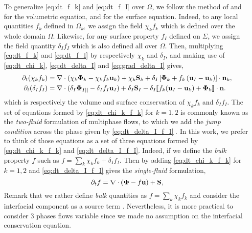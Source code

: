 To generalize \ref{eq:dt_f_k} and \ref{eq:dt_f_I} over $\Omega$, we follow the method of \citet{drew1983mathematical} and \citet{kataoka1986local} for the volumetric equation, and \citet{marle1982macroscopic} for the surface equation.
Indeed, to any local quantities $f_k$ defined in $\Omega_k$, we assign the field $\chi_k f_k$ which is defined over the whole domain $\Omega$. 
Likewise, for any surface property $f_I$ defined on $\Sigma$, we assign the field quantity $\delta_I f_I$ which is also defined all over $\Omega$. 
Then, multiplying \ref{eq:dt_f_k} and \ref{eq:dt_f_I} by respectively $\chi_k$ and $\delta_I$, and making use of \ref{eq:dt_chi_k}, \ref{eq:dt_delta_I} and \ref{eq:grad_delta_I} gives, 
\begin{align}
    \partial_t (\chi_k f_k)
    &= \mathbf{\nabla} \cdot (\chi_k \mathbf{\Phi}_k - \chi_k f_k \textbf{u}_k)
    + \chi_k \textbf{S}_k
    + \delta_I\left[
        \mathbf{\Phi}_k
        + f_k
        \left(
            \textbf{u}_I
            - \textbf{u}_k
        \right)
    \right]
    \cdot \textbf{n}_k ,
    \label{eq:dt_chi_k_f_k}\\
    \partial_t (\delta_If_I)  
    &= 
    \mathbf{\nabla} \cdot (\delta_I \mathbf{\Phi}_{I||} - \delta_I f_I \textbf{u}_I)
    +\delta_I\textbf{S}_I 
    - \delta_I \llbracket 
    f_k (\textbf{u}_I - \textbf{u}_k)
    + \mathbf{\Phi}_k
     \rrbracket \cdot \textbf{n}.
    \label{eq:dt_delta_I_f_I}
\end{align}
which is respectively the volume and surface conservation of $\chi_kf_k$ and $\delta_If_I$. 
The set of equations formed by \ref{eq:dt_chi_k_f_k} for $k =1,2$ is commonly known as the \textit{two-fluid} formulation of multiphase flows, to which we add the \textit{jump condition} across the phase given by \ref{eq:dt_delta_I_f_I} \citep{morel2015mathematical,tryggvason2011direct,drew1983mathematical,kataoka1986local}. 
In this work, we prefer to think of those equations as a set of three equations formed by \ref{eq:dt_chi_k_f_k} and \ref{eq:dt_delta_I_f_I}. 
Indeed, if we define the \textit{bulk} property $f$ such as $f = \sum_k \chi_k f_k + \delta_I f_I$.
Then by adding \ref{eq:dt_chi_k_f_k} for $k=1,2$ and \ref{eq:dt_delta_I_f_I} gives the \textit{single-fluid} formulation,
\begin{equation}
    \partial_t f
    = \mathbf{\nabla} \cdot (\mathbf{\Phi} - f \textbf{u})
    + \textbf{S},
    \label{eq:dt_f}
\end{equation}
Remark that we rather define \textit{bulk} quantities as $f = \sum_k \chi_k f_k$ and consider the interfacial component as a source term \citep{morel2015mathematical,tryggvason2011direct,drew1983mathematical}. 
Nevertheless, it is more practical to consider 3 phases flows variable since we made no assumption on the interfacial conservation equation. 
